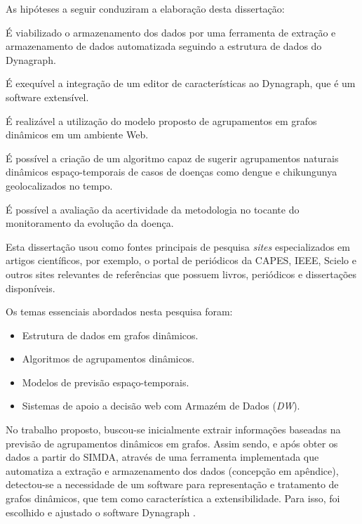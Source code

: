 As hipóteses a seguir conduziram a elaboração desta dissertação:
\begin{alineas}
    \item É viabilizado o armazenamento dos dados por uma ferramenta de extração e armazenamento de dados automatizada seguindo a estrutura de dados do Dynagraph.
	\item É exequível a integração de um editor de características ao Dynagraph, que é um software extensível.	
	\item É realizável a utilização do modelo proposto de agrupamentos em grafos dinâmicos em um ambiente Web.	
	\item É possível a criação de um algoritmo capaz de sugerir agrupamentos naturais dinâmicos espaço-temporais de casos de doenças como dengue e chikungunya geolocalizados no tempo.
	\item É possível a avaliação da acertividade da metodologia no tocante do monitoramento da evolução da doença.
\end{alineas}


Esta dissertação usou como fontes principais de pesquisa \textit{sites} especializados em artigos científicos, por exemplo, o portal de periódicos da \acrshort{CAPES}, \acrshort{IEEE}, Scielo e outros sites relevantes de referências que possuem livros, periódicos e dissertações disponíveis.

Os temas essenciais abordados nesta pesquisa foram:
\begin{itemize}
	\item Estrutura de dados em grafos dinâmicos.
	\item Algoritmos de agrupamentos dinâmicos.
	\item Modelos de previsão espaço-temporais.
	\item Sistemas de apoio a decisão web com Armazém de Dados (\textit{\acrlong{DW}}).
\end{itemize}

No trabalho proposto, buscou-se inicialmente extrair informações baseadas na previsão de agrupamentos dinâmicos em grafos. Assim sendo, e após obter os dados a partir do \acrshort{SIMDA}, através de uma ferramenta implementada que automatiza a extração e armazenamento dos dados (concepção em apêndice), detectou-se a necessidade de um software para representação e tratamento de grafos dinâmicos, que tem como característica a extensibilidade. Para isso, foi escolhido e ajustado o software Dynagraph \cite{dynagraph}.

